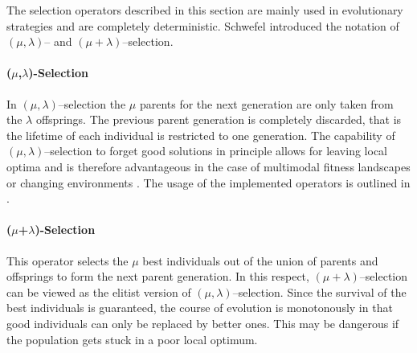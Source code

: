 The selection operators described in this section
are mainly used in evolutionary strategies and are completely
deterministic.  Schwefel \cite{Schwefel:77} introduced the notation of
$(\mu,\lambda)$-- and $(\mu+\lambda)$--selection.


        \paragraph{($\mu$,$\lambda$)-Selection}

In $(\mu,\lambda)$--selection the $\mu$ parents for the next
generation are only taken from the $\lambda$ offsprings.  The previous
parent generation is completely discarded, that is the lifetime of
each individual is restricted to one generation.  The capability of
$(\mu,\lambda)$--selection to forget good solutions in principle
allows for leaving local optima and is therefore advantageous in the
case of multimodal fitness landscapes or changing environments
\cite{Baeck:94}. The usage of the implemented operators is outlined in
.

        \paragraph{($\mu$+$\lambda$)-Selection}

This operator selects the $\mu$ best individuals out of the union of
parents and offsprings to form the next parent generation. In this
respect, $(\mu+\lambda)$--selection can be viewed as the elitist
version of $(\mu,\lambda)$--selection.  Since the survival of the best
individuals is guaranteed, the course of evolution is monotonously in
that good individuals can only be replaced by better ones. This may
be dangerous if the population gets stuck in a poor local optimum.


